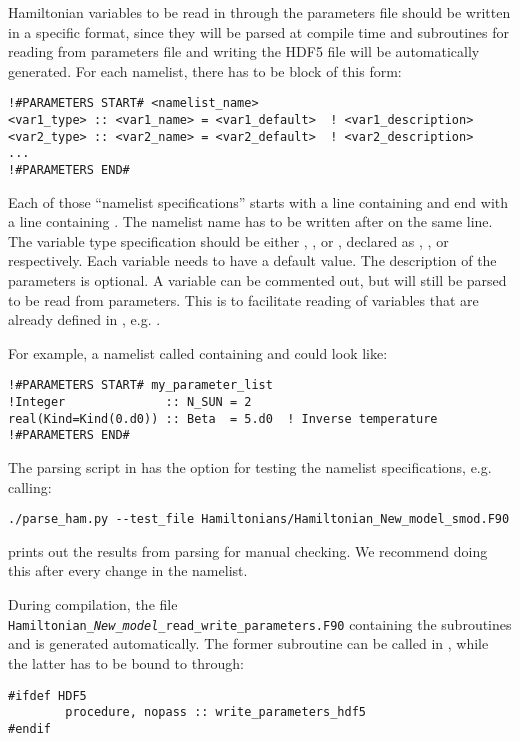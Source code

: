 Hamiltonian variables to be read in through the parameters file should be written in a specific format, since they will be parsed at compile time and subroutines for reading from parameters file and writing the HDF5 file will be automatically generated.
For each namelist, there has to be block of this form:
\begin{lstlisting}[style=fortran]
!#PARAMETERS START# <namelist_name>
<var1_type> :: <var1_name> = <var1_default>  ! <var1_description>
<var2_type> :: <var2_name> = <var2_default>  ! <var2_description>
...
!#PARAMETERS END#
\end{lstlisting}

Each of those ``namelist specifications'' starts with a line containing  and end with a line containing . The namelist name has to be written after  on the same line. The variable type specification  should be either , ,  or , declared as , ,  or  respectively. Each variable needs to have a default value. The description of the parameters is optional. A variable can be commented out, but will still be parsed to be read from parameters. This is to facilitate reading of variables that are already defined in , e.g. .

For example, a namelist called  containing  and  could look like:
\begin{lstlisting}[style=fortran]
!#PARAMETERS START# my_parameter_list
!Integer              :: N_SUN = 2
real(Kind=Kind(0.d0)) :: Beta  = 5.d0  ! Inverse temperature
!#PARAMETERS END#
\end{lstlisting}
The parsing script  in  has the option  for testing the namelist specifications, e.g. calling:
\begin{lstlisting}[style=bash]
./parse_ham.py --test_file Hamiltonians/Hamiltonian_New_model_smod.F90
\end{lstlisting}
prints out the results from parsing for manual checking. We recommend doing this after every change in the namelist.

During compilation, the file \texttt{Hamiltonian\_\emph{New\_model}\_read\_write\_parameters.F90} containing the subroutines  and  is generated automatically. The former subroutine can be called in , while the latter has to be bound to  through:
\begin{lstlisting}[style=fortran]
#ifdef HDF5
        procedure, nopass :: write_parameters_hdf5
#endif
\end{lstlisting}

